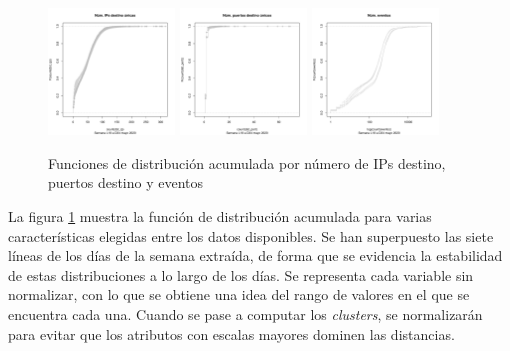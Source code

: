 \begin{figure}[h]
    \centering
    \includegraphics[width=0.3\textwidth]{contenido/fig/ecdf-count_dst_ip.pdf}
    \includegraphics[width=0.3\textwidth]{contenido/fig/ecdf-count_dst_port.pdf}
    \includegraphics[width=0.3\textwidth]{contenido/fig/ecdf-count_events.pdf}
    \caption{Funciones de distribución acumulada por número de IPs destino, puertos destino y eventos}
    \label{fig:ecdfcountdstip}
\end{figure}

La figura \ref{fig:ecdfcountdstip} muestra la función de distribución acumulada para varias características elegidas entre los datos disponibles.
Se han superpuesto las siete líneas de los días de la semana extraída, de forma que se evidencia la estabilidad de estas distribuciones a lo largo de los días.
Se representa cada variable sin normalizar, con lo que se obtiene una idea del rango de valores en el que se encuentra cada una.
Cuando se pase a computar los \emph{clusters}, se normalizarán para evitar que los atributos con escalas mayores dominen las distancias.

